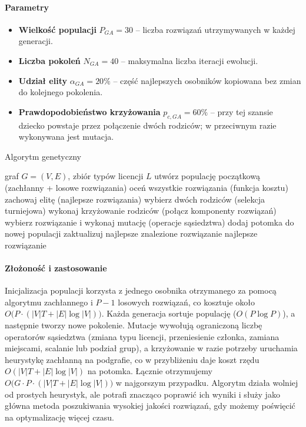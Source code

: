 \paragraph{Parametry}
\begin{itemize}
  \item \textbf{Wielkość populacji} $P_{GA}=30$ -- liczba rozwiązań utrzymywanych w każdej generacji.
  \item \textbf{Liczba pokoleń} $N_{GA}=40$ -- maksymalna liczba iteracji ewolucji.
  \item \textbf{Udział elity} $\alpha_{GA}=20\%$ -- część najlepszych osobników kopiowana bez zmian do kolejnego pokolenia.
  \item \textbf{Prawdopodobieństwo krzyżowania} $p_{c,GA}=60\%$ -- przy tej szansie dziecko powstaje przez połączenie dwóch rodziców; w przeciwnym razie wykonywana jest mutacja.
\end{itemize}

\begin{algorithm}[H]
  \caption{Algorytm genetyczny}
  \label{alg:ga}
  \begin{algorithmic}[1]
    \Require graf $G=(V,E)$, zbiór typów licencji $L$
    \State utwórz populację początkową (zachłanny + losowe rozwiązania)
    \State oceń wszystkie rozwiązania (funkcja kosztu)
    \State zachowaj elitę (najlepsze rozwiązania)
    \State wybierz dwóch rodziców (selekcja turniejowa)
    \State wykonaj krzyżowanie rodziców (połącz komponenty rozwiązań)
    \Else
    \State wybierz rozwiązanie i wykonaj mutację (operacje sąsiedztwa)
    \EndIf
    \State dodaj potomka do nowej populacji
    \EndWhile
    \State zaktualizuj najlepsze znalezione rozwiązanie
    \EndFor
    \State \Return najlepsze rozwiązanie
  \end{algorithmic}
\end{algorithm}

\paragraph{Złożoność i zastosowanie}
Inicjalizacja populacji korzysta z jednego osobnika otrzymanego za pomocą algorytmu zachłannego i $P-1$ losowych rozwiązań, co kosztuje około $O\bigl(P \cdot (|V|T + |E|\log |V|)\bigr)$. Każda generacja sortuje populację ($O(P\log P)$), a następnie tworzy nowe pokolenie. Mutacje wywołują ograniczoną liczbę operatorów sąsiedztwa (zmiana typu licencji, przeniesienie członka, zamiana miejscami, scalanie lub podział grup), a krzyżowanie w razie potrzeby uruchamia heurystykę zachłanną na podgrafie, co w przybliżeniu daje koszt rzędu $O(|V|T + |E|\log |V|)$ na potomka. Łącznie otrzymujemy $O\bigl(G \cdot P \cdot (|V|T + |E|\log |V|)\bigr)$ w najgorszym przypadku. Algorytm działa wolniej od prostych heurystyk, ale potrafi znacząco poprawić ich wyniki i służy jako główna metoda poszukiwania wysokiej jakości rozwiązań, gdy możemy poświęcić na optymalizację więcej czasu.


